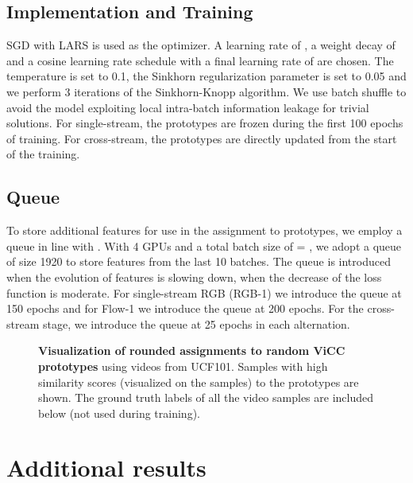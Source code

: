 \documentclass[10pt,twocolumn,letterpaper]{article}
\begin{document}
\subsection{Implementation and Training} 
SGD with LARS \cite{you_large_2017} is used as the optimizer. A learning rate of , a weight decay of  and a cosine learning rate schedule with a final learning rate of  are chosen. The temperature  is set to 0.1, the Sinkhorn regularization parameter  is set to 0.05 and we perform 3 iterations of the Sinkhorn-Knopp algorithm. We use batch shuffle \cite{he_momentum_2020} to avoid the model exploiting local intra-batch information leakage for trivial solutions. For single-stream, the prototypes are frozen during the first 100 epochs of training. For cross-stream, the prototypes are directly updated from the start of the training.

\subsection{Queue}
To store additional features for use in the assignment to prototypes, we employ a queue in line with \cite{caron_unsupervised_2020}. With 4 GPUs and a total batch size of  = , we adopt a queue of size 1920 to store features from the last 10 batches. The queue is introduced when the evolution of features is slowing down, \ie when the decrease of the loss function is moderate. For single-stream RGB (RGB-1) we introduce the queue at 150 epochs and for Flow-1 we introduce the queue at 200 epochs. For the cross-stream stage, we introduce the queue at 25 epochs in each alternation. 

\begin{figure*}
    \begin{center}
    \end{center}
    \caption{\textbf{Visualization of rounded assignments to random ViCC prototypes} using videos from UCF101. Samples with high similarity scores (visualized on the samples) to the prototypes are shown. The ground truth labels of all the video samples are included below (not used during training).}
    \label{fig:clusters}
\end{figure*}


\section{Additional results} 
\end{document}
